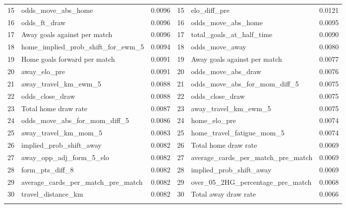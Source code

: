 \documentclass[pdflatex,sn-mathphys-num]{sn-jnl}
\theoremstyle{thmstyleone}
\theoremstyle{thmstyletwo}
\theoremstyle{thmstylethree}
\begin{document}
\begin{table}[h]
\begin{tabular*}{\textwidth}{@{\extracolsep\fill}rlc|rlc@{}}
15 & odds\_move\_abs\_home               & 0.0096 & 15 & elo\_diff\_pre                          & 0.0121 \\
16 & odds\_ft\_draw                     & 0.0096 & 16 & odds\_move\_abs\_home                   & 0.0095 \\
17 & Away goals against per match       & 0.0096 & 17 & total\_goals\_at\_half\_time            & 0.0090 \\
18 & home\_implied\_prob\_shift\_for\_ewm\_5 & 0.0094 & 18 & odds\_move\_away                       & 0.0080 \\
19 & Home goals forward per match       & 0.0091 & 19 & Away goals against per match            & 0.0077 \\
20 & away\_elo\_pre                     & 0.0091 & 20 & odds\_move\_abs\_draw                   & 0.0076 \\
21 & away\_travel\_km\_ewm\_5            & 0.0088 & 21 & odds\_move\_abs\_for\_mom\_diff\_5       & 0.0075 \\
22 & odds\_close\_draw                  & 0.0088 & 22 & odds\_close\_draw                       & 0.0075 \\
23 & Total home draw rate               & 0.0087 & 23 & away\_travel\_km\_ewm\_5                & 0.0075 \\
24 & odds\_move\_abs\_for\_mom\_diff\_5   & 0.0086 & 24 & home\_elo\_pre                          & 0.0074 \\
25 & away\_travel\_km\_mom\_5            & 0.0083 & 25 & home\_travel\_fatigue\_mom\_5           & 0.0074 \\
26 & implied\_prob\_shift\_away           & 0.0082 & 26 & Total home draw rate                    & 0.0069 \\
27 & away\_opp\_adj\_form\_5\_elo        & 0.0082 & 27 & average\_cards\_per\_match\_pre\_match   & 0.0069 \\
28 & form\_pts\_diff\_8                  & 0.0082 & 28 & implied\_prob\_shift\_away              & 0.0069 \\
29 & average\_cards\_per\_match\_pre\_match & 0.0082 & 29 & over\_05\_2HG\_percentage\_pre\_match    & 0.0068 \\
30 & travel\_distance\_km                & 0.0082 & 30 & Total away draw rate                    & 0.0066 \\
\botrule
\end{tabular*}
\end{table}
\end{document}
